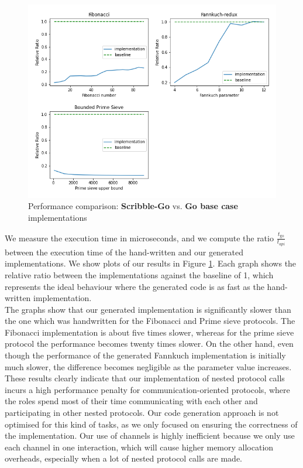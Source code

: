 \documentclass[12pt,twoside]{report}
\begin{document}
\begin{figure}[h!]
    \centering
    \includegraphics[scale=0.6]{figures/performance.png}
    \caption{Performance comparison: \textbf{Scribble-Go} vs. \textbf{Go base case} implementations}
    \label{performance-graphs}
\end{figure}

We measure the execution time in microseconds, and we compute the ratio $\frac{t_{\text{go}}}{t_{\textit{api}}}$ between the execution time of the hand-written and our generated implementations. We show plots of our results in Figure \ref{performance-graphs}. Each graph shows the relative ratio between the implementations against the baseline of 1, which represents the ideal behaviour where the generated code is as fast as the hand-written implementation.\\

The graphs show that our generated implementation is significantly slower than the one which was handwritten for the Fibonacci and Prime sieve protocols. The Fibonacci implementation is about five times slower, whereas for the prime sieve protocol the performance becomes twenty times slower. On the other hand, even though the performance of the generated Fannkuch implementation is initially much slower, the difference becomes negligible as the parameter value increases.\\

These results clearly indicate that our implementation of nested protocol calls incurs a high performance penalty for communication-oriented protocols, where the roles spend most of their time communicating with each other and participating in other nested protocols. Our code generation approach is not optimised for this kind of tasks, as we only focused on ensuring the correctness of the implementation. Our use of channels is highly inefficient because we only use each channel in one interaction, which will cause higher memory allocation overheads, especially when a lot of nested protocol calls are made.\\
\end{document}
